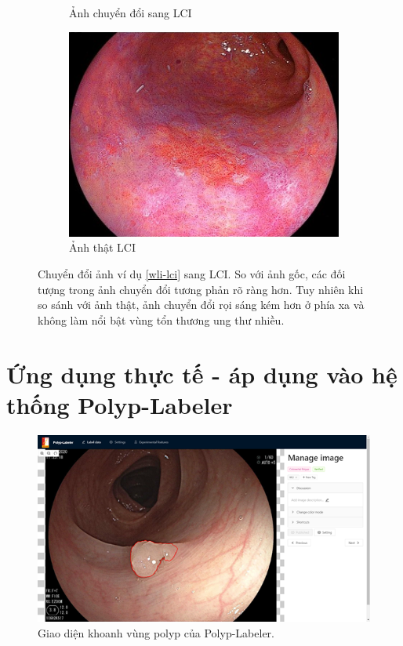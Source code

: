 \documentclass[12pt]{extreport}
\begin{document}
\begin{figure}[H]
\begin{subfigure}[H]{0.32\textwidth}
        \caption{Ảnh chuyển đổi sang LCI}
    \end{subfigure}
    \begin{subfigure}[H]{0.32\textwidth}
        \centering
        \includegraphics[width=\linewidth]{example/lci_real.png}
        \caption{Ảnh thật LCI}
    \end{subfigure}
    \caption{Chuyển đổi ảnh ví dụ \ref{wli-lci} sang LCI. So với ảnh gốc, các đối tượng trong ảnh chuyển đổi tương phản rõ ràng hơn. Tuy nhiên khi so sánh với ảnh thật, ảnh chuyển đổi rọi sáng kém hơn ở phía xa và không làm nổi bật vùng tổn thương ung thư nhiều.}
\end{figure}

\chapter{Ứng dụng thực tế - áp dụng vào hệ thống Polyp-Labeler}
\label{application-polyp-labeler}

\begin{figure}[H]
    \centering
    \includegraphics[width=0.7\linewidth]{figure43.png}
    \caption{Giao diện khoanh vùng polyp của Polyp-Labeler.}
\end{figure}
\end{document}
